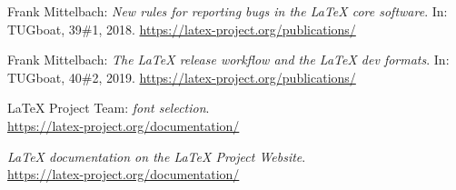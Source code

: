 \documentclass{ltnews}
\begin{document}
\begin{thebibliography}{9}


 Frank Mittelbach:
  \emph{New rules for reporting bugs in the \LaTeX{} core software}.
  In: TUGboat, 39\#1, 2018.
  \url{https://latex-project.org/publications/}

 Frank Mittelbach:
  \emph{The
  \LaTeX{} release workflow and the \LaTeX{} dev formats}.
  In: TUGboat, 40\#2, 2019.
  \url{https://latex-project.org/publications/}

 \LaTeX{} Project Team:
  \emph{\LaTeXe{} font selection}.\\
  \url{https://latex-project.org/documentation/}

  \emph{\LaTeX{} documentation on the \LaTeX{} Project Website}.\\
  \url{https://latex-project.org/documentation/}


\end{thebibliography}
\end{document}
